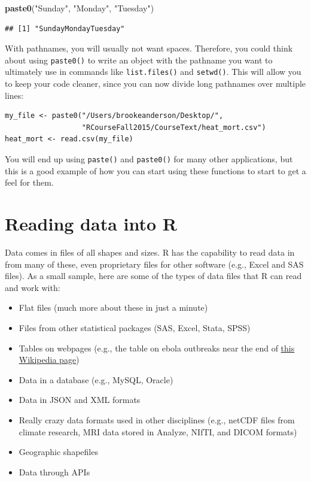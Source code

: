 \documentclass[]{book}
\makeatletter
\newenvironment{Shaded}{\begin{snugshade}}{\end{snugshade}}
\newcommand{\KeywordTok}[1]{\textcolor[rgb]{0.13,0.29,0.53}{\textbf{#1}}}
\newcommand{\StringTok}[1]{\textcolor[rgb]{0.31,0.60,0.02}{#1}}
\newcommand{\NormalTok}[1]{#1}
\providecommand{\tightlist}{%
  \setlength{\itemsep}{0pt}\setlength{\parskip}{0pt}}
\newenvironment{kframe}{%
\medskip{}
\setlength{\fboxsep}{.8em}
 \def\at@end@of@kframe{}%
 \ifinner\ifhmode%
  \def\at@end@of@kframe{\end{minipage}}%
  \begin{minipage}{\columnwidth}%
 \fi\fi%
 \def\FrameCommand##1{\hskip\@totalleftmargin \hskip-\fboxsep
 \colorbox{shadecolor}{##1}\hskip-\fboxsep
     \hskip-\linewidth \hskip-\@totalleftmargin \hskip\columnwidth}%
 \MakeFramed {\advance\hsize-\width
   \@totalleftmargin\z@ \linewidth\hsize
   \@setminipage}}%
 {\par\unskip\endMakeFramed%
 \at@end@of@kframe}
\renewenvironment{Shaded}{\begin{kframe}}{\end{kframe}}
\theoremstyle{definition}
\theoremstyle{definition}
\theoremstyle{definition}
\theoremstyle{remark}
\makeatother
\begin{document}
\begin{Shaded}
\begin{Highlighting}[]
\KeywordTok{paste0}\NormalTok{(}\StringTok{"Sunday"}\NormalTok{, }\StringTok{"Monday"}\NormalTok{, }\StringTok{"Tuesday"}\NormalTok{)}
\end{Highlighting}
\end{Shaded}

\begin{verbatim}
## [1] "SundayMondayTuesday"
\end{verbatim}

With pathnames, you will usually not want spaces. Therefore, you could
think about using \texttt{paste0()} to write an object with the pathname
you want to ultimately use in commands like \texttt{list.files()} and
\texttt{setwd()}. This will allow you to keep your code cleaner, since
you can now divide long pathnames over multiple lines:

\begin{verbatim}
my_file <- paste0("/Users/brookeanderson/Desktop/",
                  "RCourseFall2015/CourseText/heat_mort.csv")
heat_mort <- read.csv(my_file)
\end{verbatim}

You will end up using \texttt{paste()} and \texttt{paste0()} for many
other applications, but this is a good example of how you can start
using these functions to start to get a feel for them.

\section{Reading data into R}\label{reading-data-into-r}

Data comes in files of all shapes and sizes. R has the capability to
read data in from many of these, even proprietary files for other
software (e.g., Excel and SAS files). As a small sample, here are some
of the types of data files that R can read and work with:

\begin{itemize}
\tightlist
\item
  Flat files (much more about these in just a minute)
\item
  Files from other statistical packages (SAS, Excel, Stata, SPSS)
\item
  Tables on webpages (e.g., the table on ebola outbreaks near the end of
  \href{http://en.wikipedia.org/wiki/Ebola_virus_epidemic_in_West_Africa}{this
  Wikipedia page})
\item
  Data in a database (e.g., MySQL, Oracle)
\item
  Data in JSON and XML formats
\item
  Really crazy data formats used in other disciplines (e.g., netCDF
  files from climate research, MRI data stored in Analyze, NIfTI, and
  DICOM formats)
\item
  Geographic shapefiles
\item
  Data through APIs
\end{itemize}
\end{document}
